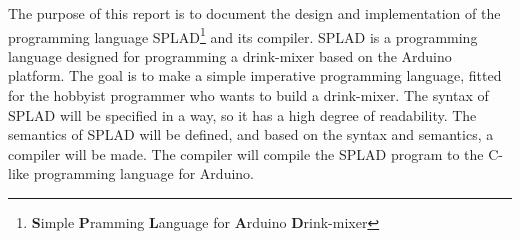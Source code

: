 The purpose of this report is to document the design and implementation of the programming language SPLAD\footnote{\textbf{S}imple \textbf{P}ramming \textbf{L}anguage for \textbf{A}rduino \textbf{D}rink-mixer} and its compiler. SPLAD is a programming language designed for programming a drink-mixer based on the Arduino platform. The goal is to make a simple imperative programming language, fitted for the hobbyist programmer who wants to build a drink-mixer. The syntax of SPLAD will be specified in a way, so it has a high degree of readability. The semantics of SPLAD will be defined, and based on the syntax and semantics, a compiler will be made. The compiler will compile the SPLAD program to the C-like programming language for Arduino.